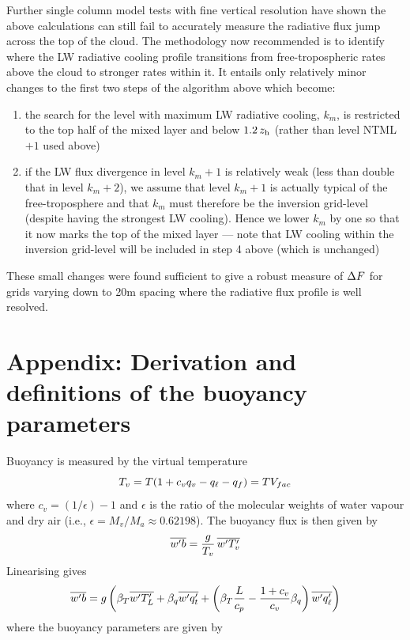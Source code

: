 \documentclass{UMDP_article}
\begin{document}
Further single column model tests with fine vertical resolution have shown 
the above calculations can still fail to accurately measure the radiative 
flux jump across the top of the cloud.  The methodology now recommended is 
to identify where the LW radiative cooling profile transitions from 
free-tropospheric rates above the cloud to stronger rates within it.  It 
entails only relatively minor changes to the first two steps of the 
algorithm above which become:
\begin{enumerate}
\item the search for the level with maximum LW radiative cooling, $k_m$, is 
restricted to the top half of the mixed layer and below $1.2 \, z_{\rm h}$ (rather 
than level NTML$+1$ used above)
\item if the LW flux divergence in level $k_m+1$ is relatively weak (less than 
double that in level $k_m+2$), we assume that level $k_m+1$ is actually typical 
of the free-troposphere and that $k_m$ must therefore be the inversion 
grid-level (despite having the strongest LW cooling).  Hence we lower 
$k_m$ by one so that it now marks the top of the mixed layer --- note that 
LW cooling within the inversion grid-level will be included in step 4 above 
(which is unchanged)
\end{enumerate}
These small changes were found sufficient to give a robust measure of 
$\Delta F$ for grids varying down to 20m spacing where the radiative 
flux profile is well resolved.

\newpage
\section{Appendix: Derivation and definitions of the buoyancy parameters}
\label{app:buoyp}

Buoyancy is measured by the virtual temperature
\begin{equation}
  T_v = T(1 + c_v q_v - q_{\ell} - q_f) = T V_{fac}
  \label{Tv}
\end{equation}
where $c_v=(1/\epsilon) -1$ and $\epsilon$ is the ratio of the
molecular weights of water vapour and dry air (\mbox{i.e.}, $\epsilon
= M_v/M_a \approx 0.62198$).  The buoyancy flux is then given by
\begin{equation*}
  \overline{w'b}  = \frac{g}{T_v}\, \overline{w'T_v'}
\end{equation*}
Linearising gives
\begin{equation*}
  \overline{w'b} = g \left( \beta_T \overline{w'T_L'} + \beta_q \overline{w'q_t'} + 
    \left( \beta_T \frac{L}{c_p} - \frac{1+c_v}{c_v} \beta_q \right)
    \overline{w'q_{\ell}'} \right) 
\end{equation*}
where the buoyancy parameters are given by
\end{document}
